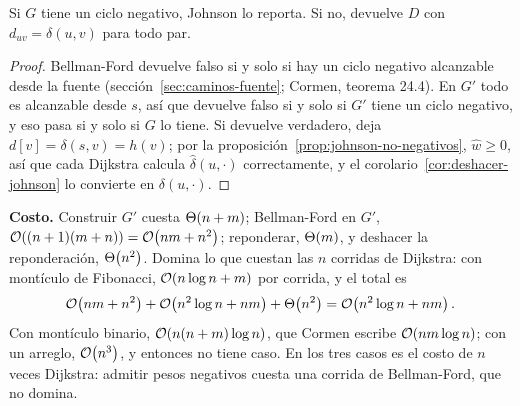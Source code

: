 \documentclass[11pt,letterpaper]{article}
\begin{document}
\begin{teorema}
  \label{teo:johnson-correcto}
  Si $G$ tiene un ciclo negativo, Johnson lo reporta. Si no,
  devuelve $D$ con $d_{uv} = \delta(u, v)$ para todo par.
\end{teorema}

\begin{proof}
  Bellman-Ford devuelve falso si y solo si hay un ciclo negativo
  alcanzable desde la fuente (sección~\ref{sec:caminos-fuente};
  Cormen, teorema 24.4). En $G'$ todo es alcanzable desde $s$, así que
  devuelve falso si y solo si $G'$ tiene un ciclo negativo, y eso pasa
  si y solo si $G$ lo tiene. Si devuelve verdadero, deja
  $d[v] = \delta(s, v) = h(v)$; por la
  proposición~\ref{prop:johnson-no-negativos}, $\hat{w} \ge 0$, así
  que cada Dijkstra calcula $\hat{\delta}(u, \cdot)$ correctamente, y
  el corolario~\ref{cor:deshacer-johnson} lo convierte en
  $\delta(u, \cdot)$.
\end{proof}

\textbf{Costo.} Construir $G'$ cuesta $\Theta\!\left(n + m\right)$; Bellman-Ford en
$G'$, $\mathcal{O}\!\left((n + 1)(m + n)\right) = \mathcal{O}\!\left(nm + n^2\right)$; reponderar, $\Theta\!\left(m\right)$, y
deshacer la reponderación, $\Theta\!\left(n^2\right)$. Domina lo que cuestan las $n$
corridas de Dijkstra: con montículo de Fibonacci,
$\mathcal{O}\!\left(n \log n + m\right)$ por corrida, y el total es
\[
  \mathcal{O}\!\left(nm + n^2\right) + \mathcal{O}\!\left(n^2 \log n + nm\right) + \Theta\!\left(n^2\right)
  = \mathcal{O}\!\left(n^2 \log n + nm\right) .
\]
Con montículo binario, $\mathcal{O}\!\left(n(n + m)\log n\right)$, que Cormen escribe
$\mathcal{O}\!\left(nm \log n\right)$; con un arreglo, $\mathcal{O}\!\left(n^3\right)$, y entonces no tiene
caso. En los tres casos es el costo de $n$ veces Dijkstra: admitir
pesos negativos cuesta una corrida de Bellman-Ford, que no domina.
\end{document}
